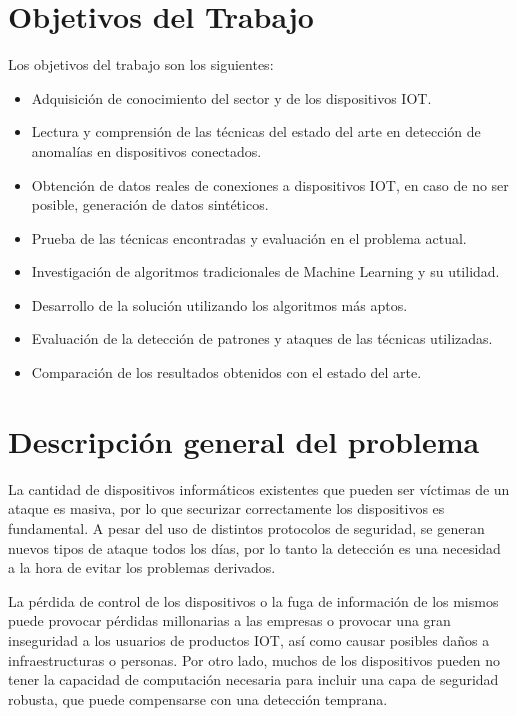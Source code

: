 \section{Objetivos del Trabajo}
Los objetivos del trabajo son los siguientes:

\begin{itemize}
  \item Adquisición de conocimiento del sector y de los dispositivos IOT.
  \item Lectura y comprensión de las técnicas del estado del arte en detección de anomalías en dispositivos conectados.
  \item Obtención de datos reales de conexiones a dispositivos IOT, en caso de no ser posible, generación de datos sintéticos.
  \item Prueba de las técnicas encontradas y evaluación en el problema actual.
  \item Investigación de algoritmos tradicionales de Machine Learning y su utilidad.
  \item Desarrollo de la solución utilizando los algoritmos más aptos.
  \item Evaluación de la detección de patrones y ataques de las técnicas utilizadas.
  \item Comparación de los resultados obtenidos con el estado del arte.
\end{itemize}

\section{Descripción general del problema}

La cantidad de dispositivos informáticos existentes que pueden ser víctimas de un ataque es masiva, por lo que securizar correctamente los dispositivos es fundamental. A pesar del uso de distintos protocolos de seguridad, se generan nuevos tipos de ataque todos los días, por lo tanto la detección es una necesidad a la hora de evitar los problemas derivados.

\vspace{0.5cm}

La pérdida de control de los dispositivos o la fuga de información de los mismos puede provocar pérdidas millonarias a las empresas o provocar una gran inseguridad a los usuarios de productos IOT, así como causar posibles daños a infraestructuras o personas. Por otro lado, muchos de los dispositivos pueden no tener la capacidad de computación necesaria para incluir una capa de seguridad robusta, que puede compensarse con una detección temprana. 


